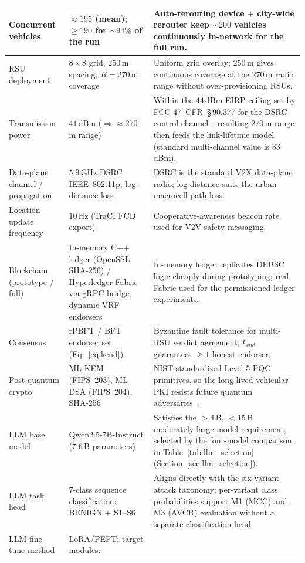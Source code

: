 \documentclass[12pt, a4paper]{report}
\begin{document}
{\begin{longtable}{| p{3.0cm} | p{4.3cm} | p{6.0cm} |}
\hline
Concurrent vehicles & $\approx195$ (mean); $\geq190$ for $\sim94\%$ of the run & Auto-rerouting device $+$ city-wide rerouter keep $\sim200$ vehicles continuously in-network for the full run. \\
\hline
RSU deployment & $8\times8$ grid, $250$\,m spacing, $R=270$\,m coverage & Uniform grid overlay; $250$\,m gives continuous coverage at the $270$\,m radio range without over-provisioning RSUs. \\
\hline
Transmission power & $41$\,dBm ($\Rightarrow \approx270$\,m range) & Within the $44$\,dBm EIRP ceiling set by FCC 47~CFR~\S\,90.377 for the DSRC control channel~\cite{fcc2004dsrc}; resulting $270$\,m range then feeds the link-lifetime model (standard multi-channel value is $33$\,dBm). \\
\hline
Data-plane channel / propagation & $5.9$\,GHz DSRC IEEE~802.11p; log-distance loss & DSRC is the standard V2X data-plane radio; log-distance suits the urban macrocell path loss. \\
\hline
Location update frequency & $10$\,Hz (TraCI FCD export) & Cooperative-awareness beacon rate used for V2V safety messaging. \\
\hline
Blockchain (prototype / full) & In-memory C++ ledger (OpenSSL SHA-256) / Hyperledger Fabric via gRPC bridge, dynamic VRF endorsers & In-memory ledger replicates DEBSC logic cheaply during prototyping; real Fabric used for the permissioned-ledger experiments. \\
\hline
Consensus & rPBFT / BFT endorser set (Eq.~\eqref{eq:kend}) & Byzantine fault tolerance for multi-RSU verdict agreement; $k_{\text{end}}$ guarantees $\geq1$ honest endorser. \\
\hline
Post-quantum crypto & ML-KEM (FIPS~203), ML-DSA (FIPS~204), SHA-256 & NIST-standardized Level-5 PQC primitives, so the long-lived vehicular PKI resists future quantum adversaries~\cite{nist2024fips203,nist2024fips204}. \\
\hline
LLM base model & Qwen2.5-7B-Instruct (7.6\,B parameters) &
Satisfies the $>$4\,B, $<$15\,B moderately-large model requirement;
selected by the four-model comparison in
Table~\ref{tab:llm_selection} (Section~\ref{sec:llm_selection}). \\
\hline
LLM task head & 7-class sequence classification: BENIGN $+$ S1--S6 &
Aligns directly with the six-variant attack taxonomy; per-variant class
probabilities support M1 (MCC) and M3 (AVCR) evaluation without a
separate classification head. \\
\hline
LLM fine-tune method & LoRA/PEFT; target modules:

\end{longtable}}
\end{document}
